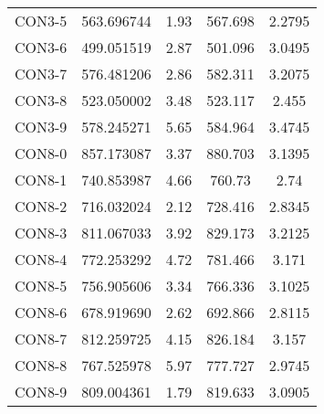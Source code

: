 \begin{table}[ht]
\begin{tabular}{c c c c c}
CON3-5 & 563.696744 & 1.93 & 567.698 & 2.2795 \\
CON3-6 & 499.051519 & 2.87 & 501.096 & 3.0495 \\
CON3-7 & 576.481206 & 2.86 & 582.311 & 3.2075 \\
CON3-8 & 523.050002 & 3.48 & 523.117 & 2.455 \\
CON3-9 & 578.245271 & 5.65 & 584.964 & 3.4745 \\
CON8-0 & 857.173087 & 3.37 & 880.703 & 3.1395 \\
CON8-1 & 740.853987 & 4.66 & 760.73 & 2.74 \\
CON8-2 & 716.032024 & 2.12 & 728.416 & 2.8345 \\
CON8-3 & 811.067033 & 3.92 & 829.173 & 3.2125 \\
CON8-4 & 772.253292 & 4.72 & 781.466 & 3.171 \\
CON8-5 & 756.905606 & 3.34 & 766.336 & 3.1025 \\
CON8-6 & 678.919690 & 2.62 & 692.866 & 2.8115 \\
CON8-7 & 812.259725 & 4.15 & 826.184 & 3.157 \\
CON8-8 & 767.525978 & 5.97 & 777.727 & 2.9745 \\
CON8-9 & 809.004361 & 1.79 & 819.633 & 3.0905 \\
[1ex]\hline
\end{tabular}
\label{table:nonlin}
\end{table} \clearpage
